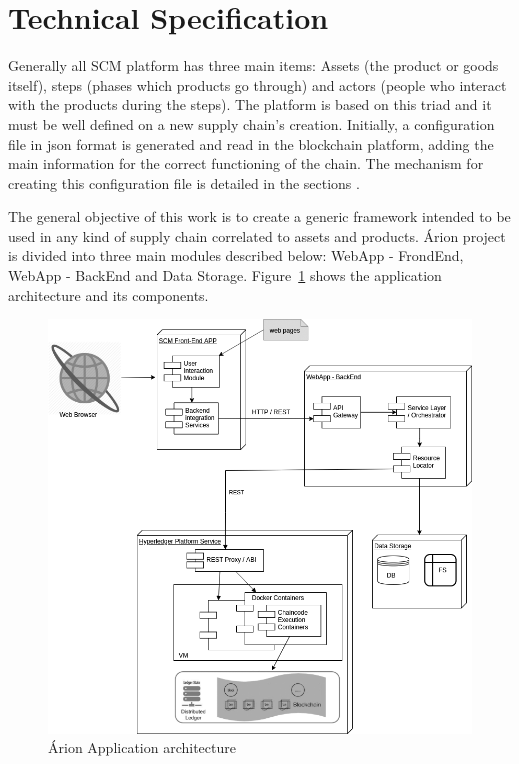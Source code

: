\section{Technical Specification} \label{sec:Technical}

Generally all SCM platform has three main items: Assets (the product or goods itself), steps (phases which products go through) and actors (people who interact with the products during the steps). The platform is based on this triad and it must be well defined on a new supply chain's creation. Initially, a configuration file in json format is generated and read in the blockchain platform, adding the main information for the correct functioning of the chain. The mechanism for creating this configuration file is detailed in the sections .

The general objective of this work is to create a generic framework intended to be used in any kind of supply chain correlated to assets and products. Árion project is divided into three main modules described below: WebApp - FrondEnd, WebApp - BackEnd and Data Storage. Figure~\ref{fig:detalhamentotecnico} shows the application architecture and its components.

\begin{figure}[ht]
\begin{center}
  \includegraphics[scale=0.4]{images/detalhamentotecnico.png}
\caption{Árion Application architecture}
\label{fig:detalhamentotecnico}
\end{center}
\end{figure}

